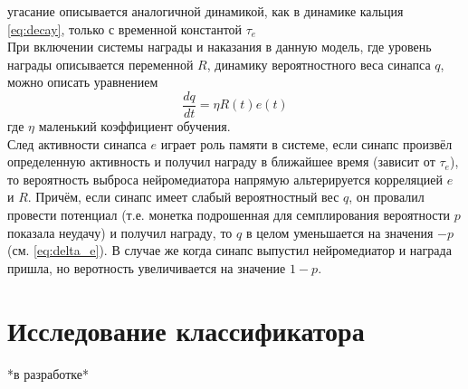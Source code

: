 \documentclass[a4paper,10pt,usenames]{article}
\begin{document}
угасание описывается аналогичной динамикой, как в динамике кальция \ref{eq:decay}, только с временной константой $\tau _e$\\
\indent При включении системы награды и наказания в данную модель, где уровень награды описывается переменной $R$, динамику вероятностного веса синапса $q$, можно описать уравнением
\begin{equation*}
\frac{dq}{dt} = \eta R(t) e(t)
\end{equation*}
где $\eta$ маленький коэффициент обучения.\\
\indent След активности синапса $e$ играет роль памяти в системе, если синапс произвёл определенную активность и получил награду в ближайшее время (зависит от $\tau_e$), то вероятность выброса нейромедиатора напрямую альтерируется корреляцией $e$ и $R$. Причём, если синапс имеет слабый вероятностный вес $q$, он провалил провести потенциал (т.е. монетка подрошенная для семплирования вероятности $p$ показала неудачу) и получил награду, то $q$ в целом уменьшается на значения $-p$ (см. \ref{eq:delta_e}). В случае же когда синапс выпустил нейромедиатор и награда пришла, но веротность увеличивается на значение $1-p$.
\section{Исследование классификатора}
*в разработке*
{}

\end{document}
